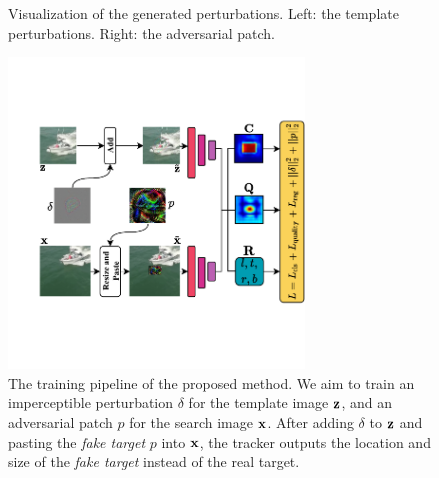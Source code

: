 \documentclass[journal]{IEEEtran}
\begin{document}
\begin{figure}[t]
  \centering
   \qquad
  \caption{Visualization of the generated perturbations. Left: the template perturbations. Right: the adversarial patch.}
  \label{fig:vis_perturbations}
\end{figure}

\begin{figure}[t]
  \centering
  \includegraphics[width=0.7\textwidth]{images/network_v5.pdf}
  \caption{The training pipeline of the proposed method. We aim to train an imperceptible perturbation $\delta$ for the template image $\textbf z$, and an adversarial patch $p$ for the search image $\textbf x$. After adding $\delta$ to $\textbf z$ and pasting the \textit{fake target} $p$ into $\textbf x$, the tracker outputs the location and size of the \textit{fake target} instead of the real target.}
  \label{fig:net}
\end{figure}
\end{document}
